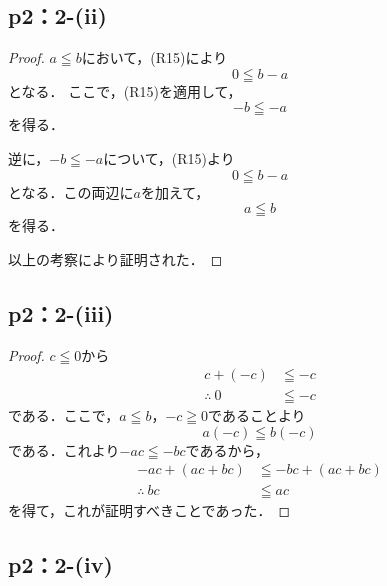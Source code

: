\documentclass[a4paper,10pt,fleqn]{ltjsarticle}
\begin{document}
\subsection*{p2：2-(ii)}

\begin{leftbar}
    \begin{proof}
        $a \leqq b$において，(R15)により
        \[
            0 \leqq b-a
        \]
        となる．
        ここで，(R15)を適用して，
        \[
            -b \leqq -a
        \]
        を得る．

        逆に，$-b\leqq -a$について，(R15)より
        \[
            0 \leqq b -a
        \]
        となる．この両辺に$a$を加えて，
        \[
            a \leqq b
        \]
        を得る．

        以上の考察により証明された．
    \end{proof}
\end{leftbar}

\newpage

\subsection*{p2：2-(iii)}

\begin{leftbar}
    \begin{proof}
        $c \leqq 0$から
        \begin{align*}
            c+(-c)         & \leqq -c \\
            \therefore ~ 0 & \leqq -c
        \end{align*}
        である．ここで，$a \leqq b$，$-c \geqq 0$であることより
        \[
            a(-c) \leqq b (-c)
        \]
        である．これより$ -ac \leqq -bc$であるから，
        \begin{align*}
            -ac + (ac+bc)   & \leqq -bc +(ac+bc) \\
            \therefore ~ bc & \leqq ac
        \end{align*}
        を得て，これが証明すべきことであった．
    \end{proof}
\end{leftbar}

\subsection*{p2：2-(iv)}
\end{document}
